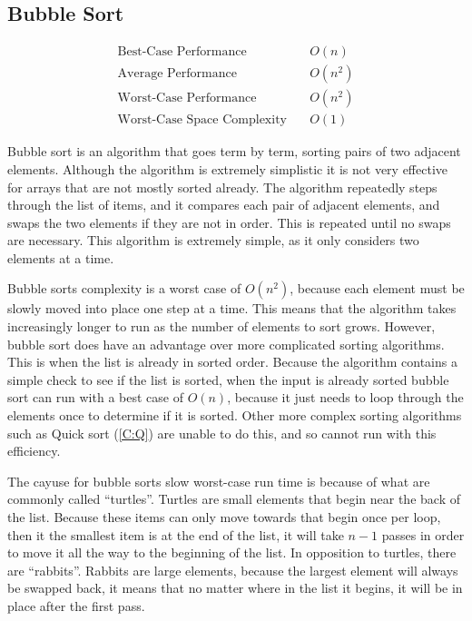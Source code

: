 \documentclass{subfile}
\begin{document}
\subsection{Bubble Sort}\label{C:B}
\begin{align*}
  \text{Best-Case Performance}\quad &O\left(n\right)\\
  \text{Average Performance}\quad &O\left(n^{2}\right)\\
  \text{Worst-Case Performance}\quad &O\left(n^{2}\right)\\
  \text{Worst-Case Space Complexity}\quad &O\left(1\right)
\end{align*}
\begin{multicols}{2}
  Bubble sort is an algorithm that goes term by term, sorting pairs of two adjacent elements. Although the algorithm is extremely simplistic it is not very effective for arrays that are not mostly sorted already. The algorithm repeatedly steps through the list of items, and it compares each pair of adjacent elements, and swaps the two elements if they are not in order. This is repeated until no swaps are necessary. This algorithm is extremely simple, as it only considers two elements at a time.
  \par
  Bubble sorts complexity is a worst case of $O\left(n^{2}\right)$, because each element must be slowly moved into place one step at a time. This means that the algorithm takes increasingly longer to run as the number of elements to sort grows. However, bubble sort does have an advantage over more complicated sorting algorithms. This is when the list is already in sorted order. Because the algorithm contains a simple check to see if the list is sorted, when the input is already sorted bubble sort can run with a best case of $O\left( n\right)$, because it just needs to loop through the elements once to determine if it is sorted. Other more complex sorting algorithms such as Quick sort (\ref{C:Q}) are unable to do this, and so cannot run with this efficiency.
  \par
  The cayuse for bubble sorts slow worst-case run time is because of what are commonly called ``turtles''. Turtles are small elements that begin near the back of the list. Because these items can only move towards that begin once per loop, then it the smallest item is at the end of the list, it will take $n-1$ passes in order to move it all the way to the beginning of the list. In opposition to turtles, there are ``rabbits''. Rabbits are large elements, because the largest element will always be swapped back, it means that no matter where in the list it begins, it will be in place after the first pass.

\end{multicols}
\end{document}
